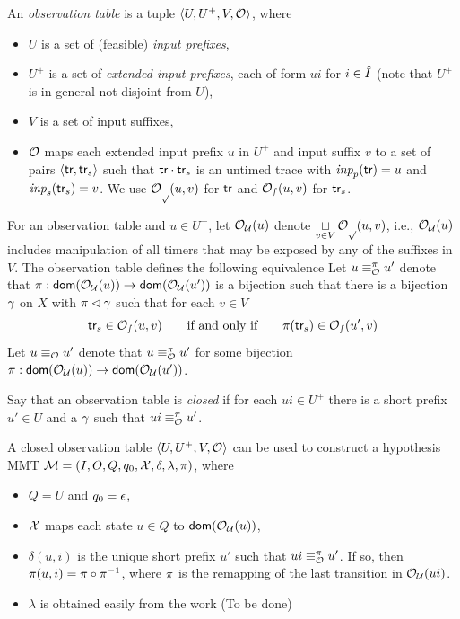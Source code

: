 \begin{definition}
  An \emph{observation table} is a tuple
  $\langle U,U^+,V,{\cal O}\rangle$, where
  \begin{itemize}
  \item $U$ is a set of (feasible) {\em input prefixes},
  \item $U^+$ is a set of {\em extended input prefixes}, each of form $ui$ for
    $i \in \hat{I}$ (note that $U^+$ is in general not disjoint from $U$),
  \item
    $V$ is a set of input suffixes,
  \item
    ${\cal O}$ maps each extended input prefix $u$ in $U^+$ and input suffix $v$
    to a set of pairs $\langle \textsf{tr},\textsf{tr}_s\rangle$ such that 
    $\textsf{tr}\cdot\textsf{tr}_s$ is an untimed trace with
$\textit{inp}_p(\textsf{tr}) = u$ and $\textit{inp}_s(\textsf{tr}_s) = v$.
   We use ${\cal O_p}(u,v)$ for $\textsf{tr}$ and 
   ${\cal O_s}(u,v)$ for $\textsf{tr}_s$.
  \end{itemize}
\end{definition}
For an observation table and $u \in U^+$,
let ${\cal O_U}(u)$ denote
\(
\displaystyle\mathop\sqcup_{v \in V}{\cal O_p}(u,v)
\),
i.e., ${\cal O_U}(u)$ includes manipulation of all timers that may be
exposed by any of the suffixes in $V$.
The observation table defines the following equivalence
Let $u \equiv_{{\cal O}}^{\pi} u'$ denote that
$\pi: {\textsf{dom}}({\cal O_U}(u)) \rightarrow {\textsf{dom}}({\cal O_U}(u'))$
is a bijection such that there is a bijection $\gamma$ on $X$ with
$\pi \lhd\gamma$ such that for each $v \in V$
\[
\textsf{tr}_s \in {\cal O_s}(u,v)
\qquad \mbox{if and only if} \qquad
\pi(\textsf{tr}_s) \in {\cal O_s}(u',v)
\]
Let $u \equiv_{{\cal O}} u'$ denote that 
$u \equiv_{{\cal O}}^{\pi} u'$ for some bijection
$\pi: {\textsf{dom}}({\cal O_U}(u)) \rightarrow {\textsf{dom}}({\cal O_U}(u'))$.

Say that an observation table is {\em closed} if for each
$ui \in U^+$ there is a short prefix $u' \in U$ and a $\gamma$ such that
$ui \equiv_{{\cal O}}^{\pi} u'$.

A closed observation table $\langle U,U^+,V,{\cal O}\rangle$ can be used to construct
a hypothesis  MMT ${\cal M} = (I, O, Q, q_0, \mathcal{X}, \delta, \lambda, \pi)$, where
\begin{itemize}
\item
  $Q = U$ and $q_0 = \epsilon$,
\item
  $\mathcal{X}$ maps each state $u \in Q$ to ${\textsf{dom}}({\cal O_U}(u))$,
\item
  $\delta(u,i)$ is the unique short prefix $u'$ such that
  $ui \equiv_{{\cal O}}^{\pi} u'$. If so, then
  $\pi(u,i) = \pi\circ\pi^{-1}$,
  where $\pi$ is the remapping of the last transition in
  ${\cal O_U}(ui)$.
  \item
$\lambda$ is obtained easily from the work (To be done)
\end{itemize}









